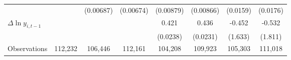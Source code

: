 {\begin{tabular}{l*{7}{c}}
          &                  &(0.00687)         &(0.00674)         &(0.00879)         &(0.00866)         & (0.0159)         & (0.0176)         \\
[1em]
$\Delta \ln y_{i,t-1}$&                  &                  &                  &    0.421\sym{***}&    0.436\sym{***}&   -0.452         &   -0.532         \\
          &                  &                  &                  & (0.0238)         & (0.0231)         &  (1.633)         &  (1.811)         \\
\hline
Observations&  112,232         &  106,446         &  112,161         &  104,208         &  109,923         &  105,303         &  111,018         \\
\hline\hline
\end{tabular}
}
